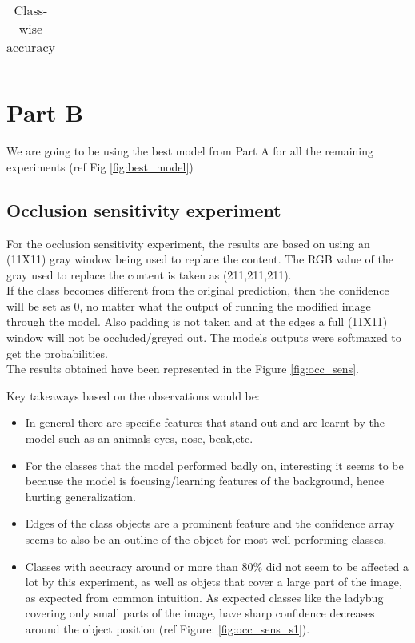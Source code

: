 \documentclass{article}
\begin{document}
\begin{table} [H]
\begin{minipage}{0.5\textwidth}
\begin{tabular}{c|lc}
\end{tabular}
\end{minipage}
\caption{Class-wise accuracy}
\end{table}


\section{Part B}
We are going to be using the best model from Part A for all the remaining experiments (ref Fig \ref{fig:best_model})

\subsection{Occlusion sensitivity experiment}

For the occlusion sensitivity experiment, the results are based on using an (11X11) gray window being used to replace the content. The RGB value of the gray used to replace the content is taken as (211,211,211). 
\\

\noindent
If the class becomes different from the original prediction, then the confidence will be set as 0, no matter what the output of running the modified image through the model.
Also padding is not taken and at the edges a full (11X11) window will not be occluded/greyed out. The models outputs were softmaxed to get the probabilities.
\\

\noindent
The results obtained have been represented in the Figure \ref{fig:occ_sens}.

\noindent
Key takeaways based on the observations would be:
\begin{itemize}
    \item In general there are specific features that stand out and are learnt by the model such as an animals eyes, nose, beak,etc.
    \item For the classes that the model performed badly on, interesting it seems to be because the model is focusing/learning features of the background, hence hurting generalization.
    \item Edges of the class objects are a prominent feature and the confidence array seems to also be an outline of the object for most well performing classes.
    \item Classes with accuracy around or more than 80\% did not seem to be affected a lot by this experiment, as well as objets that cover a large part of the image, as expected from common intuition. As expected classes like the ladybug covering only small parts of the image, have sharp confidence decreases around the object position (ref Figure: \ref{fig:occ_sens_s1}).
\end{itemize}
\end{document}
